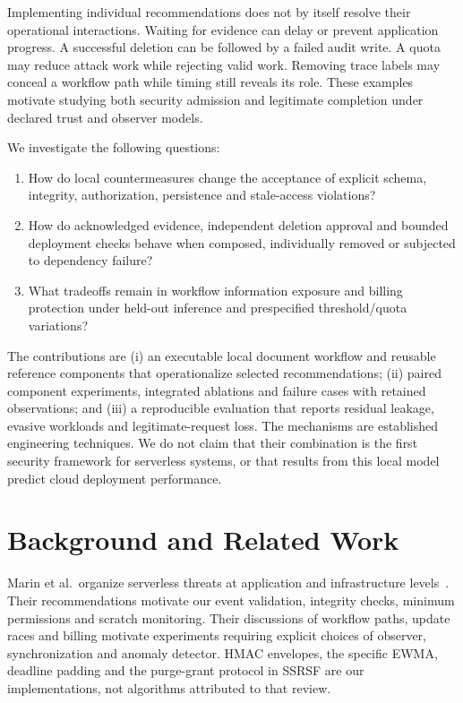\documentclass[11pt,a4paper]{article}
\begin{document}
Implementing individual recommendations does not by itself resolve their operational interactions. Waiting for evidence can delay or prevent application progress. A successful deletion can be followed by a failed audit write. A quota may reduce attack work while rejecting valid work. Removing trace labels may conceal a workflow path while timing still reveals its role. These examples motivate studying both security admission and legitimate completion under declared trust and observer models.

We investigate the following questions:
\begin{enumerate}[label=RQ\arabic*.]
\item How do local countermeasures change the acceptance of explicit schema, integrity, authorization, persistence and stale-access violations?
\item How do acknowledged evidence, independent deletion approval and bounded deployment checks behave when composed, individually removed or subjected to dependency failure?
\item What tradeoffs remain in workflow information exposure and billing protection under held-out inference and prespecified threshold/quota variations?
\end{enumerate}

The contributions are (i) an executable local document workflow and reusable reference components that operationalize selected recommendations; (ii) paired component experiments, integrated ablations and failure cases with retained observations; and (iii) a reproducible evaluation that reports residual leakage, evasive workloads and legitimate-request loss. The mechanisms are established engineering techniques. We do not claim that their combination is the first security framework for serverless systems, or that results from this local model predict cloud deployment performance.

\section{Background and Related Work}
Marin et al.\ organize serverless threats at application and infrastructure levels~\cite{marin}. Their recommendations motivate our event validation, integrity checks, minimum permissions and scratch monitoring. Their discussions of workflow paths, update races and billing motivate experiments requiring explicit choices of observer, synchronization and anomaly detector. HMAC envelopes, the specific EWMA, deadline padding and the purge-grant protocol in SSRSF are our implementations, not algorithms attributed to that review.
\end{document}
